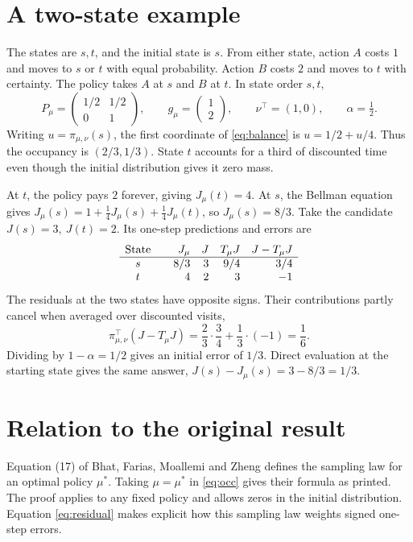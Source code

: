 \documentclass[12pt,a4paper]{article}
\begin{document}
\section*{A two-state example}
The states are \(s,t\), and the initial state is \(s\). From either state,
action \(A\) costs \(1\) and moves to \(s\) or \(t\) with equal probability.
Action \(B\) costs \(2\) and moves to \(t\) with certainty. The policy
takes \(A\) at \(s\) and \(B\) at \(t\). In state order \(s,t\),
\[
 P_\mu=\begin{pmatrix}1/2&1/2\\0&1\end{pmatrix},\qquad
 g_\mu=\begin{pmatrix}1\\2\end{pmatrix},\qquad
 \nu^\top=(1,0),\qquad \alpha=\tfrac12 .
\]
Writing \(u=\pi_{\mu,\nu}(s)\), the first coordinate of
\eqref{eq:balance} is \(u=1/2+u/4\). Thus the occupancy is
\((2/3,1/3)\). State \(t\) accounts for a third of discounted time even
though the initial distribution gives it zero mass.

At \(t\), the policy pays \(2\) forever, giving \(J_\mu(t)=4\). At \(s\),
the Bellman equation gives
\(J_\mu(s)=1+\tfrac14 J_\mu(s)+\tfrac14 J_\mu(t)\), so \(J_\mu(s)=8/3\).
Take the candidate \(J(s)=3,\ J(t)=2\). Its one-step predictions and
errors are
\[
 \begin{array}{c@{\qquad}r@{\quad}r@{\quad}r@{\quad}r}
   \text{State} & J_\mu & J & T_\mu J & J-T_\mu J\\ \hline
   s & 8/3 & 3 & 9/4 & \phantom{-}3/4\\
   t & 4   & 2 & 3   & -1
 \end{array}
\]
The residuals at the two states have opposite signs. Their contributions
partly cancel when averaged over discounted visits,
\[
 \pi_{\mu,\nu}^\top(J-T_\mu J)=\frac23\cdot\frac34+\frac13\cdot(-1)=\frac16 .
\]
Dividing by \(1-\alpha=1/2\) gives an initial error of \(1/3\). Direct
evaluation at the starting state gives the same answer,
\(J(s)-J_\mu(s)=3-8/3=1/3\).

\section*{Relation to the original result}
Equation (17) of Bhat, Farias, Moallemi and Zheng defines the sampling law
for an optimal policy \(\mu^*\). Taking \(\mu=\mu^*\) in \eqref{eq:occ}
gives their formula as printed. The proof applies to any fixed policy and
allows zeros in the initial distribution. Equation \eqref{eq:residual}
makes explicit how this sampling law weights signed one-step errors.
\end{document}
